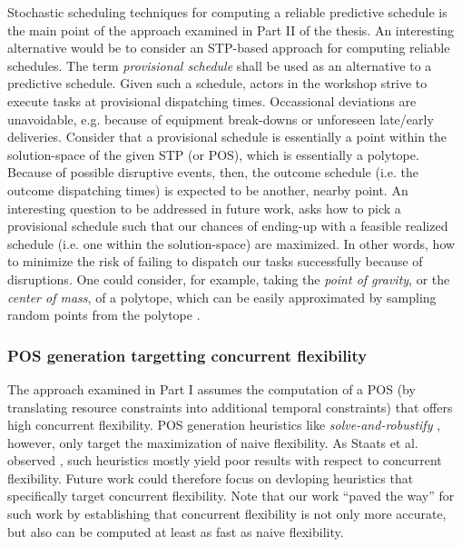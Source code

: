	Stochastic scheduling techniques for computing a reliable predictive schedule 
	is the main point of the approach examined in Part II of the thesis.
	An interesting alternative would be to consider an STP-based approach for computing reliable schedules.
	The term \emph{provisional schedule} shall be used as an alternative to a predictive schedule.
 	Given such a schedule, actors in the workshop strive to execute tasks at provisional dispatching times.
	Occassional deviations are unavoidable, e.g. because of equipment break-downs or unforeseen late/early deliveries. 
	Consider that a provisional schedule is essentially a point within the solution-space of the given STP (or POS), which is essentially a polytope.
 	Because of possible disruptive events, then, the outcome schedule (i.e. the outcome dispatching times) is expected to be another, nearby point.
	An interesting question to be addressed in future work, 
	asks how to pick a provisional schedule such that our chances of ending-up with a feasible realized schedule
	(i.e. one within the solution-space) are maximized.
	In other words, how to minimize the risk of failing to dispatch our tasks successfully because of disruptions. 
 	One could consider, for example,
 	taking the \emph{point of gravity}, or the \emph{center of mass}, of a polytope,
 	which can be easily approximated by sampling random points from the polytope \cite{kannan1997random}.
 		

 	\subsubsection*{POS generation targetting concurrent flexibility}

	The approach examined in Part I assumes the computation of a POS 
	(by translating resource constraints into additional temporal constraints) that offers high concurrent flexibility. 
	POS generation heuristics like \emph{solve-and-robustify} \cite{policella2009solve}, however, only target the maximization of naive flexibility.
	As Staats et al. observed \cite{staats2014}, such heuristics mostly yield poor results with respect to concurrent flexibility.	
	Future work could therefore focus on devloping heuristics that specifically target concurrent flexibility.
 	Note that our work ``paved the way'' for such work by establishing that concurrent flexibility
 	is not only more accurate, but also can be computed at least as fast as naive flexibility.
  
